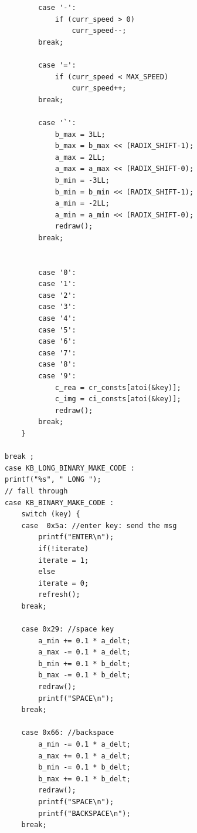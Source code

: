 \documentclass{article}
\begin{document}
\begin{lstlisting}
                    case '-':
                        if (curr_speed > 0)
                            curr_speed--;                         
                    break;
                    
                    case '=':
                        if (curr_speed < MAX_SPEED)
                            curr_speed++;
                    break;
                   
                    case '`':
                        b_max = 3LL;
                        b_max = b_max << (RADIX_SHIFT-1);
                        a_max = 2LL;
                        a_max = a_max << (RADIX_SHIFT-0);
                        b_min = -3LL;
                        b_min = b_min << (RADIX_SHIFT-1);
                        a_min = -2LL;
                        a_min = a_min << (RADIX_SHIFT-0);
                        redraw();                        
                    break;
                    
                    
                    case '0': 
                    case '1': 
                    case '2': 
                    case '3': 
                    case '4': 
                    case '5': 
                    case '6': 
                    case '7': 
                    case '8': 
                    case '9':
                        c_rea = cr_consts[atoi(&key)];
                        c_img = ci_consts[atoi(&key)];
                        redraw();
                    break;                    
                }
                    
            break ;
            case KB_LONG_BINARY_MAKE_CODE :
            printf("%s", " LONG ");
            // fall through
            case KB_BINARY_MAKE_CODE :
                switch (key) {
                case  0x5a: //enter key: send the msg
                    printf("ENTER\n");
                    if(!iterate)
                    iterate = 1;
                    else
                    iterate = 0;
                    refresh();
                break; 
                
                case 0x29: //space key
                    a_min += 0.1 * a_delt;
                    a_max -= 0.1 * a_delt;                    
                    b_min += 0.1 * b_delt;
                    b_max -= 0.1 * b_delt;
                    redraw();
                    printf("SPACE\n");
                break;
                
                case 0x66: //backspace
                    a_min -= 0.1 * a_delt;
                    a_max += 0.1 * a_delt;                    
                    b_min -= 0.1 * b_delt;
                    b_max += 0.1 * b_delt;
                    redraw();
                    printf("SPACE\n");                
                    printf("BACKSPACE\n");
                break;  
                

\end{lstlisting}
\end{document}

